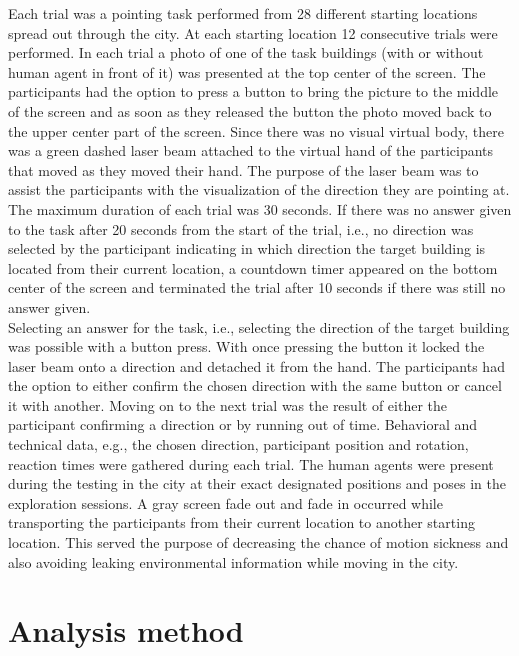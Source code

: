 Each trial was a pointing task performed from 28 different starting locations spread out through the city. At each starting location 12 consecutive trials were performed. In each trial a photo of one of the task buildings (with or without human agent in front of it) was presented at the top center of the screen. The participants had the option to press a button to bring the picture to the middle of the screen and as soon as they released the button the photo moved back to the upper center part of the screen. Since there was no visual virtual body, there was a green dashed laser beam attached to the virtual hand of the participants that moved as they moved their hand. The purpose of the laser beam was to assist the participants with the visualization of the direction they are pointing at. The maximum duration of each trial was 30 seconds. If there was no answer given to the task after 20 seconds from the start of the trial, i.e., no direction was selected by the participant indicating in which direction the target building is located from their current location, a countdown timer appeared on the bottom center of the screen and terminated the trial after 10 seconds if there was still no answer given. \\

Selecting an answer for the task, i.e., selecting the direction of the target building was possible with a button press. With once pressing the button it locked the laser beam onto a direction and detached it from the hand. The participants had the option to either confirm the chosen direction with the same button or cancel it with another. Moving on to the next trial was the result of either the participant confirming a direction or by running out of time. Behavioral and technical data, e.g., the chosen direction, participant position and rotation, reaction times were gathered during each trial. The human agents were present during the testing in the city at their exact designated positions and poses in the exploration sessions. A gray screen fade out and fade in occurred while transporting the participants from their current location to another starting location. This served the purpose of decreasing the chance of motion sickness and also avoiding leaking environmental information while moving in the city.



\section{Analysis method}

